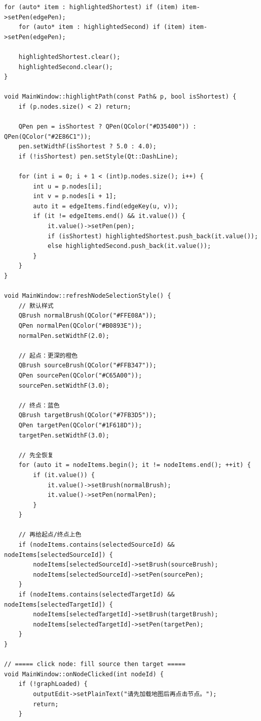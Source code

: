 \documentclass[UTF8,12pt,a4paper]{ctexart}
\begin{document}
\begin{lstlisting}[caption={mainwindow.cpp 源码}]
    for (auto* item : highlightedShortest) if (item) item->setPen(edgePen);
    for (auto* item : highlightedSecond) if (item) item->setPen(edgePen);

    highlightedShortest.clear();
    highlightedSecond.clear();
}

void MainWindow::highlightPath(const Path& p, bool isShortest) {
    if (p.nodes.size() < 2) return;

    QPen pen = isShortest ? QPen(QColor("#D35400")) : QPen(QColor("#2E86C1"));
    pen.setWidthF(isShortest ? 5.0 : 4.0);
    if (!isShortest) pen.setStyle(Qt::DashLine);

    for (int i = 0; i + 1 < (int)p.nodes.size(); i++) {
        int u = p.nodes[i];
        int v = p.nodes[i + 1];
        auto it = edgeItems.find(edgeKey(u, v));
        if (it != edgeItems.end() && it.value()) {
            it.value()->setPen(pen);
            if (isShortest) highlightedShortest.push_back(it.value());
            else highlightedSecond.push_back(it.value());
        }
    }
}

void MainWindow::refreshNodeSelectionStyle() {
    // 默认样式
    QBrush normalBrush(QColor("#FFE08A"));
    QPen normalPen(QColor("#B0893E"));
    normalPen.setWidthF(2.0);

    // 起点：更深的橙色
    QBrush sourceBrush(QColor("#FFB347"));
    QPen sourcePen(QColor("#C65A00"));
    sourcePen.setWidthF(3.0);

    // 终点：蓝色
    QBrush targetBrush(QColor("#7FB3D5"));
    QPen targetPen(QColor("#1F618D"));
    targetPen.setWidthF(3.0);

    // 先全恢复
    for (auto it = nodeItems.begin(); it != nodeItems.end(); ++it) {
        if (it.value()) {
            it.value()->setBrush(normalBrush);
            it.value()->setPen(normalPen);
        }
    }

    // 再给起点/终点上色
    if (nodeItems.contains(selectedSourceId) && nodeItems[selectedSourceId]) {
        nodeItems[selectedSourceId]->setBrush(sourceBrush);
        nodeItems[selectedSourceId]->setPen(sourcePen);
    }
    if (nodeItems.contains(selectedTargetId) && nodeItems[selectedTargetId]) {
        nodeItems[selectedTargetId]->setBrush(targetBrush);
        nodeItems[selectedTargetId]->setPen(targetPen);
    }
}

// ===== click node: fill source then target =====
void MainWindow::onNodeClicked(int nodeId) {
    if (!graphLoaded) {
        outputEdit->setPlainText("请先加载地图后再点击节点。");
        return;
    }


\end{lstlisting}
\end{document}
